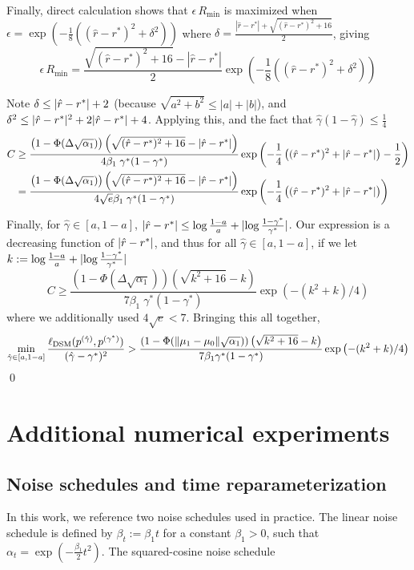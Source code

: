 \documentclass[11pt]{article}
\newcommand{\fitparenth}[1]{\left(#1\right)}
\theoremstyle{plain}
\newcommand{\1}{\mathbbm{1}}
\DeclarePairedDelimiter{\abs}{\lvert}{\rvert}
\DeclarePairedDelimiter{\norm}{\lVert}{\rVert}
\newcommand{\ldsm}{\ell_\mathrm{DSM}}
\newcommand{\pdist}[2][]{p_{#1}^{(#2)}}
\newcommand{\separation}{\Delta}
\begin{document}
\begin{appendices}
Finally, direct calculation shows that $\epsilon\, R_{\mathrm{min}}$ is maximized when $\epsilon=\exp\fitparenth{-\frac{1}{8}\fitparenth{(\hat r-r^*)^2 + \delta^2}}$ where $\delta = \frac{|\hat r-r^*|+ \sqrt{(\hat r-r^*)^2+16}}{2}$, giving 
\[\epsilon \, R_{\mathrm{min}} =\frac{\sqrt{(\hat r-r^*)^2+16}-|\hat r-r^*|}{2} \exp\fitparenth{-\frac{1}{8}\fitparenth{(\hat r-r^*)^2 + \delta^2}}\]

Note $\delta\leq \abs{\hat r-r^*}+2$ (because $\sqrt{a^2+b^2}\leq |a|+|b|$), and $\delta^2\leq \abs{\hat r-r^*}^2+2\abs{\hat r-r^*}+4$. Applying this, and the fact that $\hat \gamma(1-\hat \gamma)\leq\frac{1}{4}$
\begin{align*}
C&\geq \frac{\fitparenth{1-\Phi(\separation \sqrt{\alpha_1})}\fitparenth{\sqrt{(\hat r-r^*)^2+16}-|\hat r-r^*|}}{4\beta_1\;  \gamma^* (1-\gamma^*)}\exp\fitparenth{-\frac{1}{4}\fitparenth{(\hat r-r^*)^2 +\abs{\hat r-r^*}} - \frac{1}{2}}
\\
&=\frac{\fitparenth{1-\Phi(\separation \sqrt{\alpha_1})}\fitparenth{\sqrt{(\hat r-r^*)^2+16}-|\hat r-r^*|}}{4\sqrt{e}\beta_1\;  \gamma^* (1-\gamma^*)}\exp\fitparenth{-\frac{1}{4}\fitparenth{(\hat r-r^*)^2 +\abs{\hat r-r^*}}}
\end{align*}

Finally, for $\hat \gamma\in [a,1-a]$, $\abs{\hat r - r^*} \leq \log\frac{1-a}{a}+\abs{\log \frac{1-\gamma^*}{\gamma^*}}$. Our expression is a decreasing function of $\abs{\hat r-r^*}$, and thus for all $\hat \gamma\in [a,1-a]$, if we let $k:=\log\frac{1-a}{a}+\abs{\log \frac{1-\gamma^*}{\gamma^*}}$
\[C\geq \frac{\fitparenth{1-\Phi(\separation \sqrt{\alpha_1})}\fitparenth{\sqrt{k^2+16}-k}}{7\beta_1\;  \gamma^* (1-\gamma^*)}\exp\fitparenth{-\fitparenth{k^2 +k}/4}\]
where we additionally used $4\sqrt{e}<7$. Bringing this all together, 
\begin{align}
   \min_{\hat \gamma \in [a,1-a]}\frac{\ldsm(\pdist{\hat\gamma},\pdist{\gamma^*})}{(\hat\gamma-\gamma^*)^2}>\frac{(1-\Phi(\norm{\mu_1-\mu_0}\sqrt{\alpha_1}))\fitparenth{\sqrt{k^2+16}-k}}{7\beta_1\gamma^*(1-\gamma^*)}\exp\fitparenth{-(k^2+k)/4} 
\end{align}
\qed


\section{Additional numerical experiments}\label{sec:Additional Numerics}

\subsection{Noise schedules and time reparameterization}\label{sec: Reparam}
In this work, we reference two noise schedules used in practice. The linear noise schedule is defined by $\beta_t:=\beta_1 t$ for a constant $\beta_1>0$, such that $\alpha_t=\exp\fitparenth{-\frac{\beta_1}{2}t^2}$. The squared-cosine noise schedule \citep{hang2024improvednoiseschedulediffusion}


\end{appendices}
\end{document}
